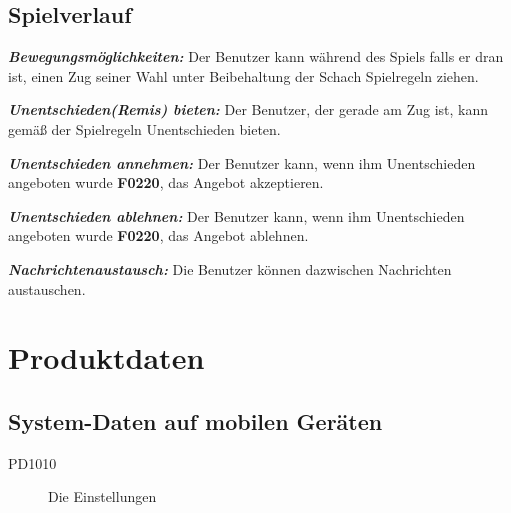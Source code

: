 \documentclass[parskip=full]{scrartcl}
\begin{document}
\subsection{Spielverlauf} 
\begin{description}
	\hypertarget{F3010}{\item[F3010]}\textbf{\textit{Bewegungsmöglichkeiten: }}Der Benutzer kann während des Spiels falls er dran ist, einen Zug seiner Wahl unter Beibehaltung der Schach Spielregeln ziehen.
	\item[F3020] \textbf{\textit{Unentschieden(Remis) bieten: }} Der Benutzer, der gerade am Zug ist, kann gemäß der Spielregeln Unentschieden bieten.
	\item[F3030] \textbf{\textit{Unentschieden annehmen: }} Der Benutzer kann, wenn ihm Unentschieden angeboten wurde \textbf{F0220}, das Angebot akzeptieren.
	\item[F3040] \textbf{\textit{Unentschieden ablehnen: }} Der Benutzer kann, wenn ihm Unentschieden angeboten wurde \textbf{F0220}, das Angebot ablehnen.
	\item[F3050]\textbf{\textit{Nachrichtenaustausch: }} Die Benutzer können dazwischen Nachrichten austauschen.
\end{description}
\newpage
\section{Produktdaten}

\subsection{System-Daten auf mobilen Geräten}
\begin{description}
	
	\item[PD1010] Die Einstellungen


\end{description}
\end{document}
